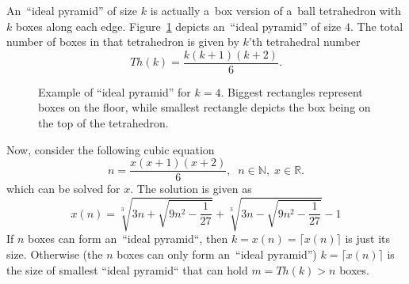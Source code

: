 \documentclass[paper=a4,DIV=12]{leetcode}
\begin{document}
An~``ideal pyramid'' of size $k$ is actually a~box version of a~ball
tetrahedron with $k$ boxes along each edge. Figure~\ref{fig:7YP7N} depicts
an~``ideal pyramid'' of size $4$. The total number of boxes in that
tetrahedron is given by $k$'th tetrahedral number~\cite{enwiki:1226358199}
\begin{equation}
  Th(k) = \frac{k(k+1)(k+2)}{6}.
  \label{eq:BP9CM}
\end{equation}
\begin{figure}[htbp]
  \centering
  \caption{Example of ``ideal pyramid'' for $k=4$. Biggest rectangles
  represent boxes on the floor, while smallest rectangle depicts the box being
  on the top of the tetrahedron.}
  \label{fig:7YP7N}
\end{figure}
Now, consider the following cubic equation
\begin{equation}
  n = \frac{x(x+1)(x+2)}{6},\;\;n \in \mathbb{N}, \; x \in \mathbb{R}.
 \label{eq:X27S1}
\end{equation}
which can be solved for $x$. The solution is given as~\cite{enwiki:1226358199}
\begin{equation}
  x(n) = \sqrt[3]{3 n + \sqrt{9 n^2 - \frac{1}{27}}} + \sqrt[3]{3 n - \sqrt{9 n^2 - \frac{1}{27}}} - 1
  \label{eq:8FFEH}
\end{equation}
If $n$ boxes can form an~``ideal pyramid``, then $k = x(n) = \lceil{x(n)}\rceil$
is just its size. Otherwise (the $n$ boxes can only form an~``ideal pyramid'')
$k = \lceil{x(n)}\rceil$ is the size of smallest ``ideal pyramid`` that can
hold $m = Th(k) > n$ boxes.
\end{document}
